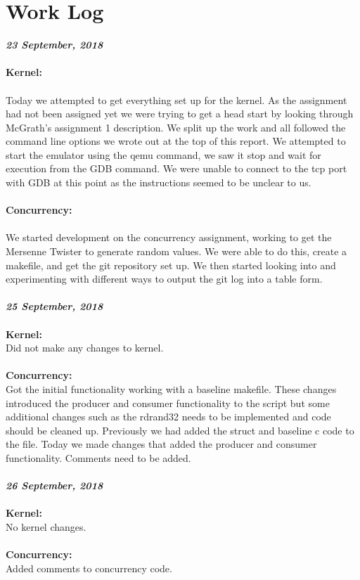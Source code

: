 \documentclass[10pt,a4paper,english]{article}
\begin{document}
\section{Work Log}

\textit{\textbf{23 September, 2018}} \\\\
\textbf{Kernel:} \\\\
\indent Today we attempted to get everything set up for the kernel. As the assignment had not been assigned yet we were trying to get a head start by looking through McGrath's assignment 1 description. We split up the work and all followed the command line options we wrote out at the top of this report. We attempted to start the emulator using the qemu command, we saw it stop and wait for execution from the GDB command. We were unable to connect to the tcp port with GDB at this point as the instructions seemed to be unclear to us.
\\\\
\textbf{Concurrency:} \\\\
\indent We started development on the concurrency assignment, working to get the Mersenne Twister to generate random values. We were able to do this, create a makefile, and get the git repository set up. We then started looking into and experimenting with different ways to output the git log into a table form.
\\\\

\noindent
\textit{\textbf{25 September, 2018}} \\\\
\textbf{Kernel:} \\
\indent Did not make any changes to kernel.
\\\\
\textbf{Concurrency:} \\
\indent Got the initial functionality working with a baseline makefile. These changes introduced the producer and consumer functionality to the script but some additional changes such as the rdrand32 needs to be implemented and code should be cleaned up. Previously we had added the struct and baseline c code to the file. Today we made changes that added the producer and consumer functionality. Comments need to be added.
\\\\

\noindent
\textit{\textbf{26 September, 2018}} \\\\
\textbf{Kernel:} \\
\indent No kernel changes.
\\\\
\textbf{Concurrency:} \\
\indent Added comments to concurrency code.
\\\\
\end{document}

